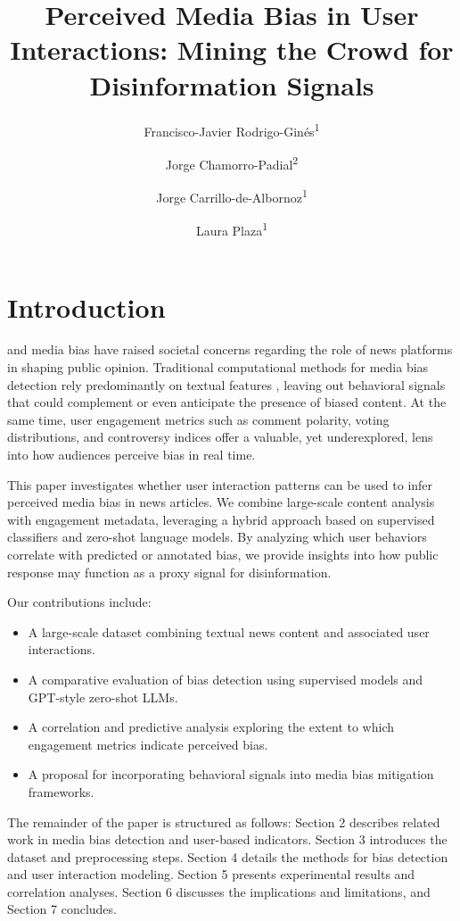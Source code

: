 \documentclass[]{ijimai_article}
\title{Perceived Media Bias in User Interactions: Mining the Crowd for Disinformation Signals}
\author{Francisco-Javier Rodrigo-Gin\'es\textsuperscript{1} \and Jorge Chamorro-Padial\textsuperscript{2} \and Jorge Carrillo-de-Albornoz\textsuperscript{1} \and Laura Plaza\textsuperscript{1}}
\affiliation{\textsuperscript{1}NLP \& IR Group, UNED, Calle Juan del Rosal, 16, Madrid, 28040, Spain\newline
\textsuperscript{2}Computer Science and Engineering Department, Universitat de Lleida, Carrer Jaume II, 69, Lleida, 25001, Spain\newline 
}
\begin{document}
\maketitle

\section{Introduction}
 and media bias have raised societal concerns regarding the role of news platforms in shaping public opinion. Traditional computational methods for media bias detection rely predominantly on textual features \cite{baly2020we, lim2020annotating}, leaving out behavioral signals that could complement or even anticipate the presence of biased content. At the same time, user engagement metrics such as comment polarity, voting distributions, and controversy indices offer a valuable, yet underexplored, lens into how audiences perceive bias in real time.

This paper investigates whether user interaction patterns can be used to infer perceived media bias in news articles. We combine large-scale content analysis with engagement metadata, leveraging a hybrid approach based on supervised classifiers and zero-shot language models. By analyzing which user behaviors correlate with predicted or annotated bias, we provide insights into how public response may function as a proxy signal for disinformation.

Our contributions include:
\begin{itemize}
    \item A large-scale dataset combining textual news content and associated user interactions.
    \item A comparative evaluation of bias detection using supervised models and GPT-style zero-shot LLMs.
    \item A correlation and predictive analysis exploring the extent to which engagement metrics indicate perceived bias.
    \item A proposal for incorporating behavioral signals into media bias mitigation frameworks.
\end{itemize}

The remainder of the paper is structured as follows: Section 2 describes related work in media bias detection and user-based indicators. Section 3 introduces the dataset and preprocessing steps. Section 4 details the methods for bias detection and user interaction modeling. Section 5 presents experimental results and correlation analyses. Section 6 discusses the implications and limitations, and Section 7 concludes.
\end{document}
